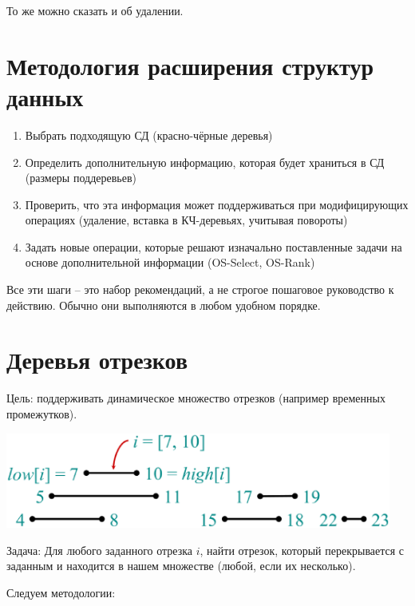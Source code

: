 \documentclass[a4paper,11pt]{article}
\begin{document}
То же можно сказать и об удалении.

\section{Методология расширения структур данных}

\begin{enumerate}
\item Выбрать подходящую СД (красно-чёрные деревья)
\item Определить дополнительную информацию, которая будет храниться в СД
  (размеры поддеревьев)
\item Проверить, что эта информация может поддерживаться при модифицирующих
  операциях (удаление, вставка в КЧ-деревьях, учитывая повороты)
\item Задать новые операции, которые решают изначально поставленные задачи на
  основе дополнительной информации (OS-Select, OS-Rank)
\end{enumerate}

Все эти шаги -- это набор рекомендаций, а не строгое пошаговое руководство к
действию. Обычно они выполняются в любом удобном порядке.

\section{Деревья отрезков}

Цель: поддерживать динамическое множество отрезков (например временных
промежутков).

\begin{center}
\includegraphics[width=5in]{lecture11/intervals.eps}
\end{center}

Задача: Для любого заданного отрезка $i$, найти отрезок, который перекрывается с
заданным и находится в нашем множестве (любой, если их несколько).

Следуем методологии:
\end{document}
